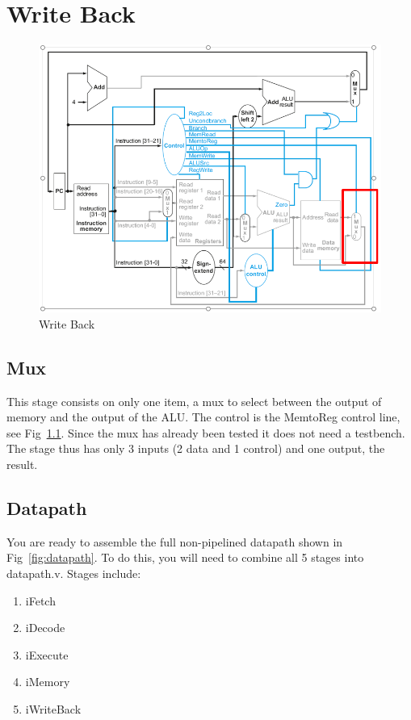 \chapter{Write Back}


\begin{figure}
\caption{Write Back}\label{fig:wb}
\begin{center}
\includegraphics[width=\textwidth]{../images/writeback_stage.png}
\end{center}
\end{figure}

\WrapBarrier

\section{Mux}
This stage consists on only one item, a mux to select between the output of memory and the output of the ALU.  The control is the MemtoReg control line, see Fig~\ref{fig:wb}.  Since the mux has already been tested it does not need a testbench.  The stage thus has only 3 inputs (2 data and 1 control) and one output, the result.

\section{Datapath}
You are ready to assemble the full non-pipelined datapath shown in Fig~\ref{fig:datapath}.  To do this, you will need to combine all 5 stages into datapath.v.  Stages include:
\begin{enumerate}
\item iFetch
\item iDecode
\item iExecute
\item iMemory
\item iWriteBack
\end{enumerate} 


